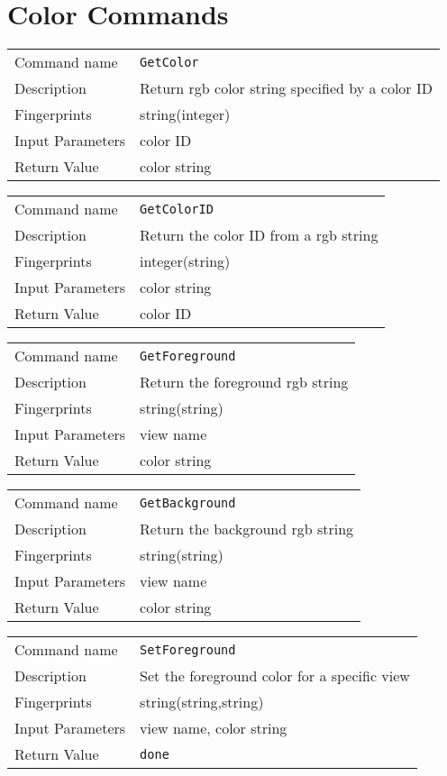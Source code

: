 \section{Color Commands}
\noindent
\begin{tabular}{l|p{5in}}
\hline
Command name &{\tt GetColor }\\ 
Description &
Return rgb color string specified by a color ID
 	\\
Fingerprints & string(integer)\\
Input Parameters&color ID\\
Return Value&color string\\
\hline
\end{tabular}
\bigskip

\noindent
\begin{tabular}{l|p{5in}}
\hline
Command name &{\tt GetColorID }\\ 
Description &
Return the color ID from a rgb string
 	\\
Fingerprints & integer(string)\\
Input Parameters&color string\\
Return Value&color ID\\
\hline
\end{tabular}
\bigskip

\noindent
\begin{tabular}{l|p{5in}}
\hline
Command name &{\tt GetForeground }\\ 
Description &
Return the foreground rgb string
 	\\
Fingerprints & string(string)\\
Input Parameters& view name\\
Return Value&color string\\
\hline
\end{tabular}
\bigskip

\noindent
\begin{tabular}{l|p{5in}}
\hline
Command name &{\tt GetBackground }\\ 
Description &
Return the background rgb string
 	\\
Fingerprints & string(string)\\
Input Parameters& view name\\
Return Value&color string\\
\hline
\end{tabular}
\bigskip

\noindent
\begin{tabular}{l|p{5in}}
\hline
Command name &{\tt SetForeground }\\ 
Description &
Set the foreground color for a specific view
 	\\
Fingerprints & string(string,string)\\
Input Parameters& view name, color string\\
Return Value&{\tt done}\\
\hline
\end{tabular}
\bigskip

